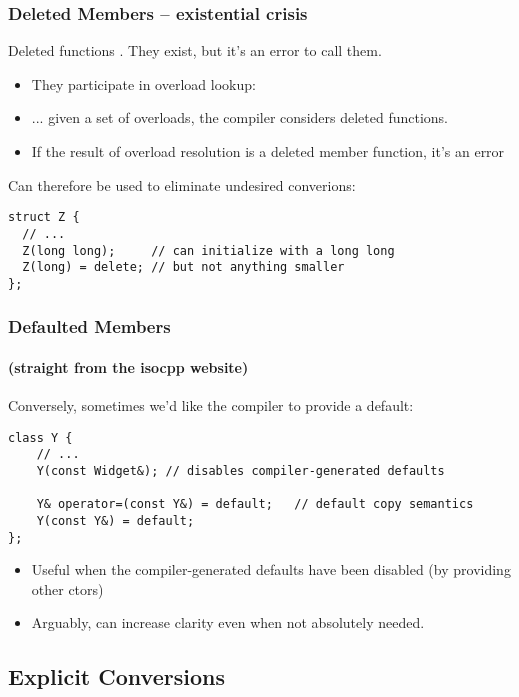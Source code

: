 \begin{frame}[fragile]
\frametitle{Deleted Members -- existential crisis}
Deleted functions .  They exist, but it's
an error to call them.
\begin{itemize}
\item They participate in overload lookup:
\pause{}
\item ... given a set of overloads, the compiler considers deleted
  functions.
\item If the result of overload resolution is a deleted member
  function, it's an error
\pause{}
\end{itemize}

\pause{}
\vskip 12pt
Can therefore be used to eliminate undesired converions:
{\scriptsize
\begin{verbatim}
struct Z {
  // ...
  Z(long long);     // can initialize with a long long
  Z(long) = delete; // but not anything smaller
};
\end{verbatim}
}




\end{frame}


\begin{frame}[fragile]
\frametitle{Defaulted Members}
\framesubtitle{(straight from the isocpp website)}
Conversely, sometimes we'd like the compiler to provide a default:
{\scriptsize
\begin{verbatim}
class Y {
    // ...
    Y(const Widget&); // disables compiler-generated defaults

    Y& operator=(const Y&) = default;   // default copy semantics
    Y(const Y&) = default;
};
\end{verbatim}
}
\pause{}
\begin{itemize}
\item Useful when the compiler-generated defaults have been disabled (by
providing other ctors)
\item Arguably, can increase clarity even when not absolutely needed.
\end{itemize}
\end{frame}


\subsection{Explicit Conversions}


